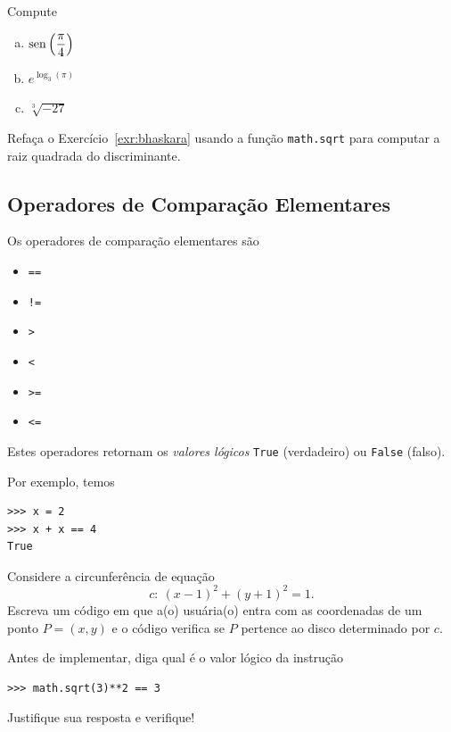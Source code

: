 \documentclass[12pt]{article}
\begin{document}
\begin{exr}
  Compute
  \begin{enumerate}[a)]
  \item $\displaystyle \operatorname{sen}\left(\frac{\pi}{4}\right)$
  \item $\displaystyle e^{\log_3(\pi)}$
  \item $\displaystyle \sqrt[3]{-27}$
  \end{enumerate}
\end{exr}

\begin{exr}
  Refaça o Exercício~\ref{exr:bhaskara} usando a função \lstinline+math.sqrt+ para computar a raiz quadrada do discriminante.
\end{exr}

\subsection{Operadores de Comparação Elementares}

Os operadores de comparação elementares são
\begin{itemize}
\item[]\lstinline+==+ 
\item[]\lstinline+!=+ 
\item[]\lstinline+>+ 
\item[]\lstinline+<+ 
\item[]\lstinline+>=+ 
\item[]\lstinline+<=+ 
\end{itemize}
Estes operadores retornam os \emph{valores lógicos} \lstinline+True+ (verdadeiro) ou \lstinline+False+ (falso).

Por exemplo, temos
\begin{lstlisting}
>>> x = 2
>>> x + x == 4
True
\end{lstlisting}

\begin{exr}
  Considere a circunferência de equação
  \begin{equation}
    c: ~(x - 1)^2 + (y + 1)^2 = 1.
  \end{equation}
  Escreva um código em que a(o) usuária(o) entra com as coordenadas de um ponto $P = (x, y)$ e o código verifica se $P$ pertence ao disco determinado por $c$.
\end{exr}

\begin{exr}
  Antes de implementar, diga qual é o valor lógico da instrução
\begin{lstlisting}
>>> math.sqrt(3)**2 == 3
\end{lstlisting}
  Justifique sua resposta e verifique!
\end{exr}
\end{document}
